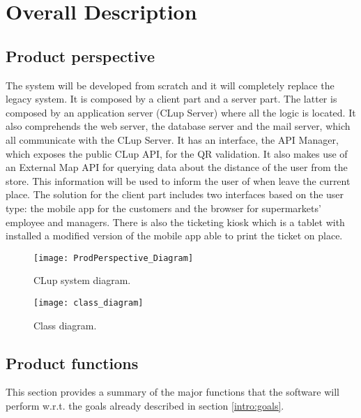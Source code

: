 \chapter{Overall Description}

\section{Product perspective}

The system will be developed from scratch and it will completely replace the legacy system. \newline
It is composed by a client part and a server part.
The latter is composed by an application server (CLup Server) where all the logic is located. It also comprehends the web server, the database server and the mail server,
which all communicate with the CLup Server.
It has an interface, the API Manager, which exposes the public CLup API, for the QR validation. It also makes use of an External Map API for querying data about the
distance of the user from the store. This information will be used to inform the user of when leave the current place.\newline
The solution for the client part includes two interfaces based on the user type: the mobile app for the customers and the browser for supermarkets' employee and managers.
There is also the ticketing kiosk which is a tablet with installed a modified version of the mobile app able to print the ticket on place.
\vspace{1em}
\begin{figure}[H]
	\centering
	\texttt{[image: ProdPerspective\_Diagram]}
	\caption{CLup system diagram.}
\end{figure}

\begin{figure}[H]
	\centering
	\texttt{[image: class\_diagram]}
	\caption{Class diagram.}
\end{figure}
\section{Product functions}\label{desc:prodFunc}
This section provides a summary of the major functions that the software will perform w.r.t. the goals already described in section \ref{intro:goals}.

